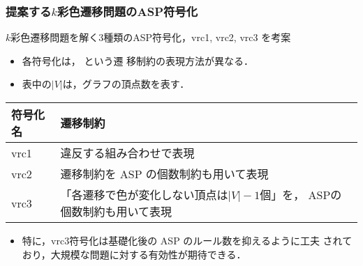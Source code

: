 \documentclass[dvipdfmx,11pt]{beamer}
\begin{document}

\begin{frame}\frametitle{提案する$k$彩色遷移問題のASP符号化}

  \begin{block}{}\centering
    $k$彩色遷移問題を解く3種類のASP符号化，vrc1, vrc2, vrc3 を考案
  \end{block}

  \begin{itemize}
  \item 各符号化は，
    という遷
    移制約の表現方法が異なる．
  \item 表中の$|V|$は，グラフの頂点数を表す．
  \end{itemize}

  \begin{exampleblock}{}\centering
    \begin{tabular}{l|p{8cm}}
      符号化名 & 遷移制約 \\\hline
      vrc1 & 違反する組み合わせで表現  \\ \hline
      vrc2 & 遷移制約を ASP の個数制約も用いて表現\\\hline
      vrc3 & 「各遷移で色が変化しない頂点は$|V|-1$個」を，
             ASPの個数制約も用いて表現
    \end{tabular}
  \end{exampleblock}


  \begin{itemize}
  \item 特に，vrc3符号化は基礎化後の ASP のルール数を抑えるように工夫
    されており，大規模な問題に対する有効性が期待できる．
  \end{itemize}

\end{frame}

\begin{comment}
\begin{frame}\frametitle{ベンチマーク}

  \begin{itemize}
    \item 現時点で組合せ遷移問題は理論面の研究が主流であり, ベンチマークの整備が必要.
    \item 実験においてステップ$t$を与えるとき, その上限値が必要となる.
    \item ステップ$t$の上限値は, グラフ$G$を$k$彩色するときの実行可能解の数と等しい.
  \end{itemize}

  従って, 全解列挙が可能な($G, k$)からベンチマークを生成する必要がある.
  
\end{frame}
\end{comment}
\end{document}

